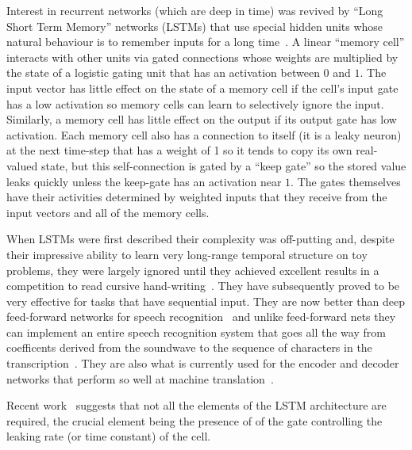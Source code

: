 \documentclass[]{article}
\begin{document}
Interest in recurrent networks (which are deep in time) was revived by
``Long Short Term Memory'' networks (LSTMs) that use special hidden units
whose natural behaviour is to remember inputs for a long
time~\citep{Hochreiter+Schmidhuber-1997}.  
A linear ``memory cell'' interacts with other units
via gated connections whose weights are multiplied by the state of a
logistic gating unit that has an activation between $0$ and $1$. The input
vector has little effect on the state of a memory cell if the cell's input
gate has a low activation so memory cells can learn to selectively ignore
the input.  Similarly, a memory cell has little effect on the output if its
output gate has low activation. Each memory cell also has a connection to
itself (it is a leaky neuron) at the next time-step that has a weight of 1 so it tends to copy its
own real-valued state, but this self-connection is gated by a ``keep gate'' so
the stored value leaks quickly unless the keep-gate has an activation
near $1$.  The gates themselves have their activities determined by
weighted inputs that they receive from the input vectors and all of the
memory cells.

When LSTMs were first described %
\citep{Hochreiter+Schmidhuber-1997} their complexity was off-putting
and, despite their impressive ability to learn very long-range temporal
structure on toy problems, they were largely ignored until they achieved
excellent results in a competition to read cursive
hand-writing~\citep{Graves-et-al-2009}. They have subsequently proved to be very
effective for tasks that have sequential input.  They are now better than
deep feed-forward networks for speech recognition~\citep{gravestimit} and
unlike feed-forward nets they can implement an entire speech recognition
system that goes all the way from coefficents derived from the soundwave to
the sequence of characters in the transcription~\citep{gravestimit}.  They
are also what is currently used for the encoder and decoder networks that
perform so well at machine
translation~\citep{Bahdanau-et-al-arxiv2014,Sutskever-et-al-NIPS2014}.

Recent work~\citep{Chung-et-al-NIPSDL2014} suggests that not all the elements of the LSTM
architecture are required, the crucial element being the presence of
of the gate controlling the leaking rate (or time constant) of the cell.
\end{document}
